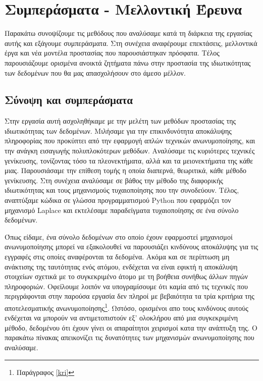 \chapter{Συμπεράσματα - Μελλοντική Έρευνα}

Παρακάτω συνοψίζουμε τις μεθόδους που αναλύσαμε κατά τη διάρκεια της εργασίας αυτής και εξάγουμε συμπεράσματα. Στη συνέχεια αναφέρουμε επεκτάσεις, μελλοντικά έργα και νέα μοντέλα προστασίας που παρουσιάστηκαν πρόσφατα. Τέλος παρουσιάζουμε ορισμένα ανοικτά ζητήματα πάνω στην προστασία της ιδιωτικότητας των δεδομένων που θα μας απασχολήσουν στο άμεσο μέλλον.

\section{Σύνοψη και συμπεράσματα}

Στην εργασία αυτή ασχοληθήκαμε με την μελέτη των μεθόδων προστασίας της ιδιωτικότητας των δεδομένων. Μιλήσαμε για την επικινδυνότητα αποκάλυψης πληροφορίας που προκύπτει από την εφαρμογή απλών τεχνικών ανωνυμοποίησης, και την ανάγκη εισαγωγής πολυπλοκότερων μεθόδων. Αναλύσαμε τις κυριότερες τεχνικές γενίκευσης, τονίζοντας τόσο τα πλεονεκτήματα, αλλά και τα μειονεκτήματα της κάθε μιας. Παρουσιάσαμε την επίθεση τομής η οποία διαπερνά, θεωριτικά, κάθε μέθοδο γενίκευσης. Στη συνέχεια αναλύσαμε σε βάθος την μέθοδο της διαφορικής ιδιωτικότητας και τους μηχανισμούς τυχαιοποίησης που την συνοδεύουν. Τέλος, αναπτύξαμε κώδικα σε γλώσσα προγραμματισμού \textlatin{Python} που εφαρμόζει τον μηχανισμό \textlatin{Laplace} και εκτελέσαμε παραδείγματα τυχαιοποίησης σε ένα σύνολο δεδομένων.




Όπως είδαμε, ένα σύνολο δεδομένων στο οποίο έχουν εφαρμοστεί μηχανισμοί ανωνυμοποίησης μπορεί να εξακολουθεί να παρουσιάζει κινδύνους αποκάλυψης για τις εγγραφές στις οποίες αναφέρονται τα δεδομένα. Ακόμα και σε περίπτωση μη ανάκτισης της ταυτότητας ενός ατόμου, ενδέχεται να είναι εφικτή η αποκάλυψη στοιχείων σχετικά με το συγκεκριμένο άτομο με τη βοήθεια συνήθως άλλων πηγών πληροφοριών. Οφείλουμε λοιπόν να υπογραμίσουμε ότι καμία από τις τεχνικές που περιγράφονται στην παρούσα εργασία δεν πληροί με βεβαιότητα τα τρία κριτήρια της αποτελεσματικής ανωνυμοποίησης\footnote{Παράγραφος \ref{kri}}. Ωστόσο, ορισμένοι απο τους κινδύνους αυτούς ενδέχεται να μπορούν να αντιμετοπιστούν εξ' ολοκλήρου από μια συγκεκριμένη μέθοδο, δεδομένου ότι έχουν γίνει οι απαραίτητοι χειρισμοί κατα την ανάπτυξη της. Ο παρακάτω πίνακας απεικονίζει τις δυνατότητες των μηχανισμών ανωνυμοποίησης που αναλύσαμε.

